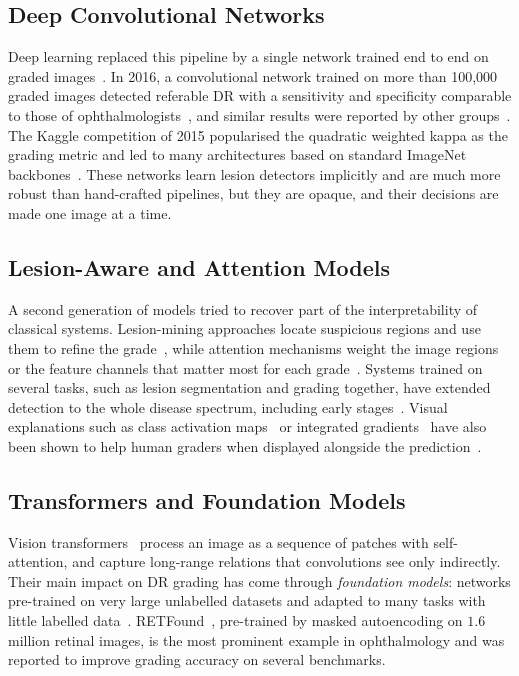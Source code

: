 \subsection{Deep Convolutional Networks}

Deep learning replaced this pipeline by a single network trained end to end on graded
images~\cite{lecun2015deep,litjens2017survey}. In 2016, a convolutional network trained on
more than 100{,}000 graded images detected referable DR with a sensitivity and
specificity comparable to those of ophthalmologists~\cite{gulshan2016jama}, and similar
results were reported by other groups~\cite{abramoff2016improved,gargeya2017automated,
ting2017jama}. The Kaggle competition of 2015 popularised the quadratic weighted kappa as
the grading metric and led to many architectures based on standard ImageNet
backbones~\cite{he2016resnet,szegedy2016inception,tan2019efficientnet}. These networks
learn lesion detectors implicitly and are much more robust than hand-crafted pipelines,
but they are opaque, and their decisions are made one image at a time.

\subsection{Lesion-Aware and Attention Models}

A second generation of models tried to recover part of the interpretability of classical
systems. Lesion-mining approaches locate suspicious regions and use them to refine the
grade~\cite{quellec2017deep,wang2017zoomin}, while attention mechanisms weight the image
regions or the feature channels that matter most for each
grade~\cite{hu2018senet,he2021cabnet}. Systems trained on several tasks, such as lesion
segmentation and grading together, have extended detection to the whole disease spectrum,
including early stages~\cite{dai2021deepdr}. Visual explanations such as class activation
maps~\cite{zhou2016cam} or integrated gradients~\cite{sundararajan2017ig} have also been
shown to help human graders when displayed alongside the prediction~\cite{sayres2019integrated}.

\subsection{Transformers and Foundation Models}

Vision transformers~\cite{dosovitskiy2021vit} process an image as a sequence of patches
with self-attention, and capture long-range relations that convolutions see only
indirectly. Their main impact on DR grading has come through \emph{foundation models}:
networks pre-trained on very large unlabelled datasets and adapted to many tasks with
little labelled data~\cite{bommasani2021foundation}. RETFound~\cite{zhou2023retfound},
pre-trained by masked autoencoding on $1.6$ million retinal images, is the most prominent
example in ophthalmology and was reported to improve grading accuracy on several
benchmarks.

